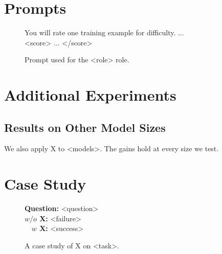 \clearpage
\section{Prompts} \label{apdx:prompts}
\begin{figure}[ht]
\centering
\begin{lrbox}{\PromptBoxA}
\begin{gptpromptbox}
\begin{minipage}{0.95\linewidth}\raggedright\scriptsize\ttfamily
You will rate one training example for difficulty. ... \\
\textcolor{roleB}{<score>} ... \textcolor{roleB}{</score>}
\end{minipage}
\end{gptpromptbox}
\end{lrbox}
\usebox{\PromptBoxA}
\caption{Prompt used for the <role> role.}
\label{fig:prompt-role}
\end{figure}

\clearpage
\section{Additional Experiments} \label{apdx:experiments}
\subsection{Results on Other Model Sizes}
We also apply X to <models>. The gains hold at every size we test.

\clearpage
\section{Case Study} \label{apdx:case-study}
\begin{figure}[ht]
\centering
\begin{promptbox}
\small
\textbf{Question:} \quad <question> \\
\textbf{$w/o$ X:} \quad \textcolor{bad}{<failure>} \\
\textbf{$\phantom{/o}w$ X:} \quad \textcolor{good}{<success>}
\end{promptbox}
\caption{A case study of X on <task>.}
\label{fig:case-study}
\end{figure}

